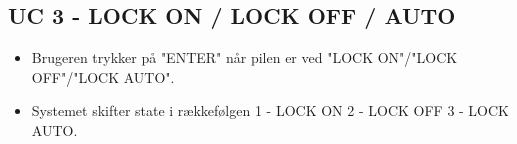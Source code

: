 \subsection{UC 3 - LOCK ON / LOCK OFF / AUTO}

\begin{itemize}
	\item Brugeren trykker på "ENTER" når pilen er ved "LOCK ON"/"LOCK OFF"/"LOCK AUTO".
	\item Systemet skifter state i rækkefølgen 1 - LOCK ON 2 - LOCK OFF 3 - LOCK AUTO.
\end{itemize}

%	
%	
%	
%	
%	
%	
%	
%	
%	
%	
%	
%	
